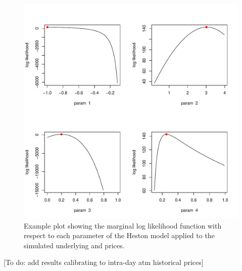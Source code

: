 \documentclass{article}
\begin{document}
\begin{figure}
\includegraphics[scale=0.8]{../figures/MLE_Heston.pdf}
\caption{Example plot showing the marginal log likelihood function with respect to each parameter of the Heston model applied to the simulated underlying and prices.}
\end{figure}


[To do: add results calibrating to intra-day atm historical prices]

\clearpage

\appendix
\end{document}
